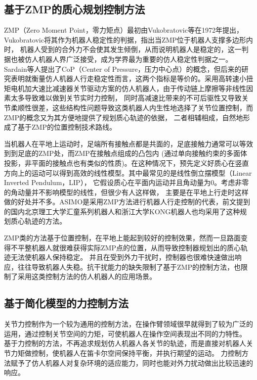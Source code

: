 \subsection{基于ZMP的质心规划控制方法}
ZMP（Zero Moment Point，零力矩点）最初由Vukobratovic等在1972年提出\cite{vukobratovic2004zero}，Vukobratovic将其作为机器人稳定性的判据，指出当ZMP位于机器人支撑多边形内时，
机器人受到的合外力不会使其发生倾倒，从而说明机器人是稳定的，这一判据也被仿人机器人界广泛接受，成为学界最为重要的仿人稳定性判据之一。
Sardain等人提出了CoP（Center of Pressure，压力中心点）的概念，但后来的研究表明就衡量仿人机器人行走稳定性而言，这两个指标是等价的。采用高转速小扭矩电机加大速比减速器关节驱动方案的仿人机器人，由于传动链上摩擦等非线性因素太多导致难以做到关节实时力控制，
同时高减速比带来的不可后驱性又导致关节柔顺性很差，这些结构性问题导致这类机器人内生性地选择了关节位置控制，而ZMP的概念又为其方便地提供了规划质心轨迹的依据，
二者相辅相成，自然地形成了基于ZMP的位置控制技术路线。

当机器人在平地上运动时，足端所有接触点都是共面的，足底接触力通常可以等效到到足底的ZMP处，而ZMP在接触点组成的凸包内\cite{wieber2002stability}
(通过单向接触约束的多面体投影，非平面的接触点也有类似的性质\cite{caron2016zmp})。在这种情况下，预先定义好质心在竖直方向上的运动可以得到高效的线性模型。其中最常见的是线性倒立摆模型（Linear Inverted Pendulum，LIP），
它假设质心在平面内运动并且角动量为0\cite{kajita1991study}。考虑非零的角动量并不影响模型的线性，但很少有人这样做，
主要是在平地上行走时这样做的好处并不多\cite{koolen2012capturability}。ASIMO是采用ZMP方法进行机器人行走控制的代表，前文提到的国内北京理工大学汇童系列机器人和浙江大学KONG机器人也均采用了这种规划质心轨迹的方法。

ZMP类的方法基于位置控制，在平地上能起到较好的控制效果，然而一旦路面变得不平整机器人就很难获得实际ZMP点的位置，从而导致控制器规划出的质心轨迹无法使机器人保持稳定。
并且在受到外力干扰时，控制器也很难快速做出响应，往往导致机器人失稳。抗干扰能力的缺失限制了基于ZMP的控制方法，也限制了采用这类控制方法的仿人机器人的应用场景。

\subsection{基于简化模型的力控制方法}
关节力控制作为一个较为通用的控制方法，在操作臂领域很早就得到了较为广泛的运用，通过控制关节空间的力矩，可使机器人在操作空间表现出不同的力特性。
基于力控制的方法，不再追求规划仿人机器人各关节的轨迹，而是直接对机器人关节力矩做控制，使机器人在笛卡尔空间保持平衡，并执行期望的运动。
力控制方法赋予了仿人机器人对复杂环境的适应能力，同时也能对外力扰动做出比较迅速的响应。

